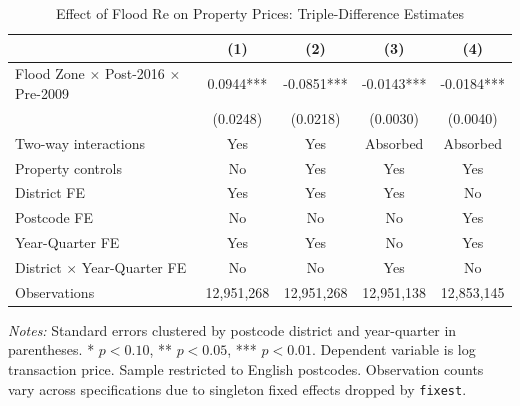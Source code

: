 \begin{table}[htbp]
\centering
\caption{Effect of Flood Re on Property Prices: Triple-Difference Estimates}
\label{tab:main_results}
\begin{tabular}{lcccc}
\toprule
 & (1) & (2) & (3) & (4) \\
\midrule
Flood Zone $\times$ Post-2016 $\times$ Pre-2009 & 0.0944*** & -0.0851*** & -0.0143*** & -0.0184*** \\
 & (0.0248) & (0.0218) & (0.0030) & (0.0040) \\
\midrule
Two-way interactions & Yes & Yes & Absorbed & Absorbed \\
Property controls & No & Yes & Yes & Yes \\
District FE & Yes & Yes & Yes & No \\
Postcode FE & No & No & No & Yes \\
Year-Quarter FE & Yes & Yes & No & Yes \\
District $\times$ Year-Quarter FE & No & No & Yes & No \\
Observations & 12,951,268 & 12,951,268 & 12,951,138 & 12,853,145 \\
\bottomrule
\end{tabular}
\begin{tablenotes}[flushleft]
\small
\item \textit{Notes:} Standard errors clustered by postcode district and year-quarter in parentheses.
* $p<0.10$, ** $p<0.05$, *** $p<0.01$.
Dependent variable is log transaction price. Sample restricted to English postcodes. Observation counts vary across specifications due to singleton fixed effects dropped by \texttt{fixest}.
\end{tablenotes}
\end{table}
